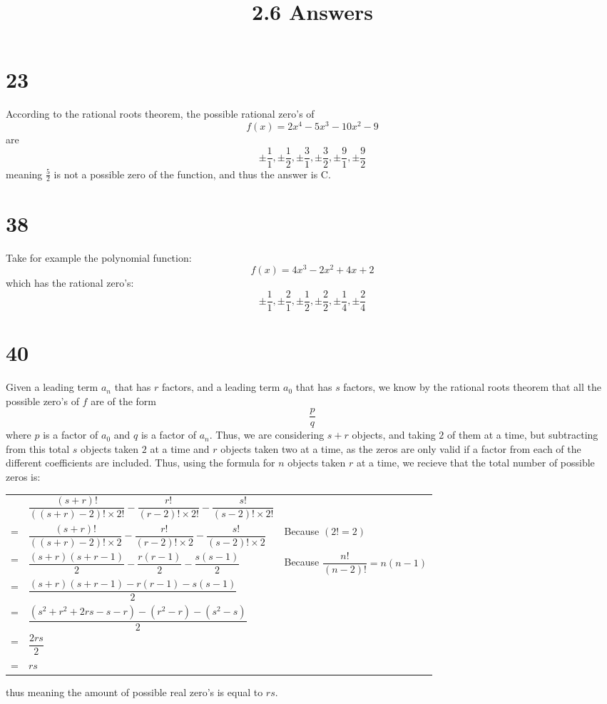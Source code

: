 \documentclass{article}
\title{2.6 Answers}
\theoremstyle{definition}
\begin{document}
\maketitle

\section*{23}


According to the rational roots theorem, the possible rational zero's of 
\[ f(x)=2x^4-5x^3-10x^2-9 \] are \[ \pm\frac{1}{1},\pm\frac{1}{2},\pm\frac{3}{1},\pm\frac{3}{2},\pm\frac{9}{1},\pm\frac{9}{2} \]
meaning $\frac{5}{2}$ is not a possible zero of the function, and thus the answer is C.

\section*{38}


Take for example the polynomial function:
\[ f(x)=4x^3-2x^2+4x+2 \]
which has the rational zero's:
\[ \pm\frac{1}{1},\pm\frac{2}{1},\pm\frac{1}{2},\pm\frac{2}{2},\pm\frac{1}{4},\pm\frac{2}{4} \]


\section*{40}


Given a leading term $a_n$ that has $r$ factors, and a leading term $a_0$ that has $s$ factors, we know by the rational roots theorem 
that all the possible zero's of $f$ are of the form \[ \dfrac{p}{q} \] where $p$ is a factor of $a_0$ and $q$ is a factor of $a_n$. 
Thus, we are considering $s+r$ objects, and taking $2$ of them at a time, but subtracting from this total $s$ objects taken $2$ at a time
and $r$ objects taken two at a time, as the zeros are only valid if a factor from each of the different coefficients are included. Thus, 
using the formula for $n$ objects taken $r$ at a time, we recieve that the total number of possible zeros is:
\begin{center}
	\begin{tabular}{lll}
		& $\dfrac{(s+r)!}{((s+r)-2)!\times 2!}-\dfrac{r!}{(r-2)!\times 2!}-\dfrac{s!}{(s-2)!\times 2!}$ \\
		= & $\dfrac{(s+r)!}{((s+r)-2)!\times 2}-\dfrac{r!}{(r-2)!\times 2}-\dfrac{s!}{(s-2)!\times 2}$ & Because $(2!=2)$ \\
		= & $\dfrac{(s+r)(s+r-1)}{2}-\dfrac{r(r-1)}{2}-\dfrac{s(s-1)}{2}$ & Because $\dfrac{n!}{(n-2)!}=n(n-1)$ \\
		= & $\dfrac{(s+r)(s+r-1)-r(r-1)-s(s-1)}{2}$ \\
		= & $\dfrac{(s^2+r^2+2rs-s-r)-(r^2-r)-(s^2-s)}{2}$ \\
		= & $\dfrac{2rs}{2}$ \\
		= & $rs$
	\end{tabular}
\end{center}
thus meaning the amount of possible real zero's is equal to $rs$.
	 
\end{document}
